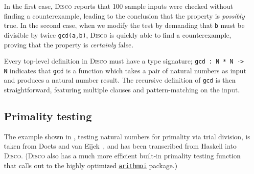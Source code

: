 \documentclass[submission,copyright,creativecommons]{eptcs}
\newcommand{\disco}{\textsc{Disco}\xspace}
\newcommand{\pkg}[1]{\href{https://hackage.haskell.org/package/#1}{\texttt{#1}}}
\newcommand{\pref}[1]{\prettyref{#1}}
\begin{document}
In the first case, \disco reports that 100 sample inputs were checked
without finding a counterexample, leading to the conclusion that the
property is \emph{possibly} true.  In the second case, when we modify
the test by demanding that \verb|b| must be divisible by twice
\verb|gcd(a,b)|, \disco is quickly able to find a counterexample,
proving that the property is \emph{certainly} false.

Every top-level definition in \disco must have a type signature;
\verb|gcd : N * N -> N| indicates that \verb|gcd| is a function which
takes a pair of natural numbers as input and produces a natural number
result.  The recursive definition of \verb|gcd| is then
straightforward, featuring multiple clauses and pattern-matching on
the input.

\subsection{Primality testing}
\label{sec:primetest}

The example shown in \pref{lst:prime}, testing natural numbers for
primality via trial division, is taken from Doets and van
Eijck~\cite[pp. 4--11]{Doets:2004}, and has been transcribed from
Haskell into \disco. (\disco also has a much more efficient built-in
primality testing function that calls out to the highly optimized
\pkg{arithmoi} package.)

\begin{listing}[!htp]
\inputminted{text}{examples/prime.disco}
\caption{Primality testing in \disco}
\label{lst:prime}
\end{listing}
\end{document}
